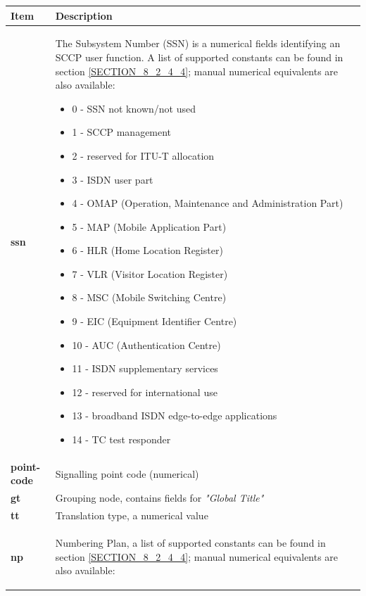 \documentclass[a4paper,latin]{paper}
\begin{document}
\clearpage
\noindent\begin{tabularx}{\textwidth}{ | l | X |}
	\hline
	Item	 				& Description \\
	\hline
	\textbf{ssn}				& The Subsystem Number (SSN) is a numerical fields identifying an SCCP user function. A list of supported constants can be found in
                                                  section \ref{SECTION_8_2_4_4}; manual numerical equivalents are also available:
						  \begin{itemize}
							\setlength{\itemsep}{0pt}
							\setlength{\parskip}{0pt}
							\setlength{\parsep}{0pt} 
							\item 0 - SSN not known/not used
							\item 1 - SCCP management
							\item 2 - reserved for ITU-T allocation
							\item 3 - ISDN user part
							\item 4 - OMAP (Operation, Maintenance and Administration Part)
							\item 5 - MAP (Mobile Application Part)
							\item 6 - HLR (Home Location Register)
							\item 7 - VLR (Visitor Location Register)
							\item 8 - MSC (Mobile Switching Centre)
							\item 9 - EIC (Equipment Identifier Centre)
							\item 10 - AUC (Authentication Centre) 
							\item 11 - ISDN supplementary services
							\item 12 - reserved for international use
							\item 13 - broadband ISDN edge-to-edge applications
							\item 14 - TC test responder
						  \end{itemize} \\ 
	\textbf{point-code}			& Signalling point code (numerical) \\ 
	\textbf{gt}				& Grouping node, contains fields for \textit{"Global Title"} \\ 
	\textbf{tt}				& Translation type, a numerical value \\
	\textbf{np}				& Numbering Plan, a list of supported constants can be found in
                                                  section \ref{SECTION_8_2_4_4}; manual numerical equivalents are also available:
						  \begin{itemize}

\end{itemize}
\end{tabularx}
\end{document}
